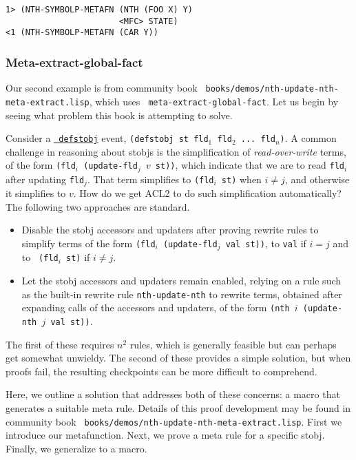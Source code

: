 \begin{verbatim}
1> (NTH-SYMBOLP-METAFN (NTH (FOO X) Y)
                       <MFC> STATE)
<1 (NTH-SYMBOLP-METAFN (CAR Y))
\end{verbatim}

\subsubsection{Meta-extract-global-fact}

Our second example is from community book {\tt
  books/demos/nth-update-nth-meta-extract.lisp}, which uses {\tt
  meta-extract-global-fact}.  Let us begin by seeing what problem this
book is attempting to solve.

Consider a
\href{http://www.cs.utexas.edu/users/moore/acl2/manuals/current/manual/index.html?topic=ACL2\_\_\_\_DEFSTOBJ}{\underline{\tt
    defstobj}} event, {\tt (defstobj st fld$_1$ fld$_2$ ... fld$_n$)}.
A common challenge in reasoning about stobjs is the simplification of
{\em read-over-write} terms, of the form {\tt (fld$_i$ (update-fld$_j$
  $v$ st))}, which indicate that we are to read {\tt fld$_i$} after
updating {\tt fld$_j$}.  That term simplifies to {\tt (fld$_i$ st)}
when $i \neq j$, and otherwise it simplifies to $v$.  How do we get
ACL2 to do such simplification automatically?  The following two
approaches are standard.

\begin{itemize}

\item Disable the stobj accessors and updaters after proving
  rewrite rules to simplify terms of the form {\tt (fld$_i$
    (update-fld$_j$ val st))}, to {\tt val} if $i = j$ and to {\tt
    (fld$_i$ st)} if $i \neq j$.

\item Let the stobj accessors and updaters remain enabled, relying on
  a rule such as the built-in rewrite rule {\tt nth-update-nth} to
  rewrite terms, obtained after expanding calls of the accessors and
  updaters, of the form {\tt (nth $i$ (update-nth $j$ val st))}.

\end{itemize}

The first of these requires $n^2$ rules, which is generally feasible
but can perhaps get somewhat unwieldy.  The second of these provides a
simple solution, but when proofs fail, the resulting checkpoints can
be more difficult to comprehend.

Here, we outline a solution that addresses both of these concerns: a
macro that generates a suitable meta rule.  Details of this proof
development may be found in community book {\tt
  books/\allowbreak{}demos/\allowbreak{}nth-update-nth-meta-extract.lisp}.
First we introduce our metafunction.  Next, we prove a meta rule for a
specific stobj.  Finally, we generalize to a macro.

